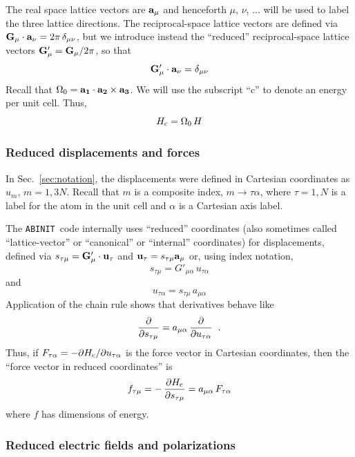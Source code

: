\documentclass[11pt,fleqn]{article}
\def\beq{\begin{equation}}
\def\eeq{\end{equation}}
\def\a{{\bf a}}
\def\G{{\bf G}}
\def\u{{\bf u}}
\def\Oo{\Omega_0}
\def\bc{_{\rm c}}
\def\ABINIT{{{\tt ABINIT}}}
\begin{document}
The real space lattice vectors are $\a_\mu$ and henceforth
$\mu$, $\nu$, ... will be used to label the three lattice
directions.  The reciprocal-space lattice vectors are defined via
\linebreak
$\G_\mu\cdot\a_\nu=2\pi\,\delta_{\mu\nu}$, but we introduce instead
the ``reduced'' reciprocal-space lattice vectors
$\G'_\mu=\G_\mu/2\pi$, so that
%
\beq
\G'_\mu\cdot\a_\nu=\delta_{\mu\nu}
\eeq
%
Recall that $\Oo={\bf a_1}\cdot{\bf a_2}\times{\bf a_3}$.
We will use the subscript ``c'' to denote an energy per unit cell.
Thus,
%
\beq
H\bc=\Oo\,H
\eeq

\subsubsection{Reduced displacements and forces}

In Sec.~\ref{sec:notation}, the displacements were defined in
Cartesian coordinates as $u_m$, $m=1,3N$.  Recall that $m$ is
a composite index, $m\rightarrow\tau\alpha$, where $\tau=1,N$
is a label for the atom in the unit cell and $\alpha$ is a
Cartesian axis label.

The \ABINIT\ code internally uses ``reduced'' coordinates (also
sometimes called ``lattice-vector'' or ``canonical'' or ``internal''
coordinates) for displacements, defined via
$s_{\tau\mu}=\G'_\mu\cdot\u_\tau$ and
$\u_\tau=s_{\tau\mu}\a_\mu$ or, using index notation,
%
\beq
s_{\tau\mu}=G'_{\mu\alpha}\,u_{\tau\alpha}
\eeq
%
and
%
\beq
u_{\tau\alpha}=s_{\tau\mu}\,a_{\mu\alpha}
\eeq
%
Application of the chain rule shows that derivatives behave like
%
\beq
{\partial\over\partial s_{\tau\mu}}=a_{\mu\alpha}\,
{\partial\over\partial u_{\tau\alpha}}
\;\;.
\eeq
%
Thus, if $F_{\tau\alpha}=-\partial H\bc/\partial u_{\tau\alpha}$
is the force vector in Cartesian coordinates, then the ``force
vector in reduced coordinates'' is
%
\beq
f_{\tau\mu}=-\,{\partial H\bc\over \partial s_{\tau\mu}}
  = a_{\mu\alpha}\,F_{\tau\alpha}
\eeq
%
where $f$ has dimensions of energy.

\subsubsection{Reduced electric fields and polarizations}
\end{document}
